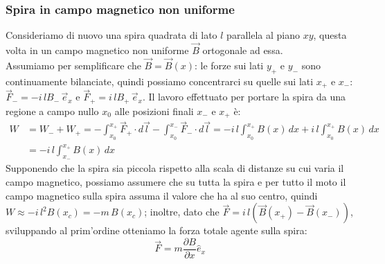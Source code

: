 \documentclass[]{article}
\begin{document}
\subsubsection{Spira in campo magnetico non uniforme}

Consideriamo di nuovo una spira quadrata di lato $ l $ parallela al piano $ xy $, questa volta in un campo magnetico non uniforme $ \vec{B} $ ortogonale ad essa. \\ 
%
Assumiamo per semplificare che $ \vec{B} = \vec{B}(x) $: le forze sui lati $ y_+ $ e $ y_- $ sono continuamente bilanciate, quindi possiamo concentrarci su quelle sui lati $ x_+ $ e $ x_- $: $ \vec{F}_- = -i\,lB_- \,\vec{e}_x $ e $ \vec{F}_+ = i\,lB_+ \,\vec{e}_x $. Il lavoro effettuato per portare la spira da una regione a campo nullo $ x_0 $ alle posizioni finali $ x_- $ e $ x_+ $ è:
\begin{equation}
	\begin{split}
		W &= W_- + W_+ = -\int_{x_0}^{x_+} \vec{F}_+ \cdot d\vec{l} - \int_{x_0}^{x_-} \vec{F}_- \cdot d\vec{l} = -i\,l\int_{x_0}^{x_+} B(x) \,dx + i\,l\int_{x_0}^{x_+} B(x) \,dx \\ 
		  &= -i\,l\int_{x_-}^{x_+} B(x) \,dx
	\end{split}
	\label{eq:}
\end{equation}
Supponendo che la spira sia piccola rispetto alla scala di distanze su cui varia il campo magnetico, possiamo assumere che su tutta la spira e per tutto il moto il campo magnetico sulla spira assuma il valore che ha al suo centro, quindi $ W \approx -i\,l^2 B(x_c) = -m\,B(x_c) $; inoltre, dato che $ \vec{F} = i\,l\left(\vec{B}(x_+) - \vec{B}(x_-)\right) $, sviluppando al prim'ordine otteniamo la forza totale agente sulla spira:
\begin{equation}
	\vec{F} = m \displaystyle\frac{\partial B}{\partial x} \hat{e}_x
	\label{eq:}
\end{equation}
\end{document}

